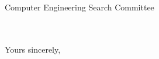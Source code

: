 




\renewcommand{\toAddr}{%
    Computer Engineering Search Committee \\ \appDept{} \\ \appSchool{} \\ \appAddr{}%
}


\begin{letter}{\toAddr{}}
    \opening{\myOpening{}}
    
    \closing{Yours sincerely,}
\end{letter}
